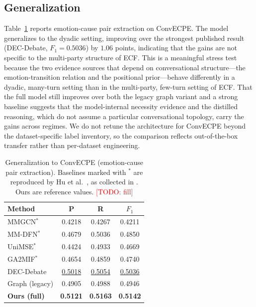 \documentclass[journal]{IEEEtran}
\newcommand{\todo}[1]{\textcolor{red}{[TODO: #1]}}
\begin{document}
\subsection{Generalization}
Table~\ref{tab:generalization} reports emotion-cause pair extraction on ConvECPE. The model
generalizes to the dyadic setting, improving over the strongest published result
(DEC-Debate, $F_1=0.5036$) by $1.06$ points, indicating that the gains are not specific to
the multi-party structure of ECF. %
This is a meaningful stress test because the two evidence sources that depend on conversational
structure---the emotion-transition relation and the positional prior---behave differently in a
dyadic, many-turn setting than in the multi-party, few-turn setting of ECF. That the full model
still improves over both the legacy graph variant and a strong baseline suggests that the
model-internal necessity evidence and the distilled reasoning, which do not assume a particular
conversational topology, carry the gains across regimes. We do not retune the architecture for
ConvECPE beyond the dataset-specific label inventory, so the comparison reflects out-of-the-box
transfer rather than per-dataset engineering.
\begin{table}[t]
\centering
\caption{Generalization to ConvECPE (emotion-cause pair extraction). Baselines marked with
$^{*}$ are reproduced by Hu et al.~\cite{jin2024unimeec}, as collected in
\cite{wu2025decdebate}. Ours are reference values. \todo{fill}}
\label{tab:generalization}
\begin{tabular}{lccc}
\toprule
Method & P & R & $F_1$ \\
\midrule
MMGCN$^{*}$ \cite{hu2021mmgcn}     & 0.4218 & 0.4267 & 0.4211 \\
MM-DFN$^{*}$ \cite{hu2022mmdfn}    & 0.4679 & 0.5036 & 0.4850 \\
UniMSE$^{*}$ \cite{hu2022unimse}   & 0.4424 & 0.4933 & 0.4669 \\
GA2MIF$^{*}$ \cite{li2023ga2mif}   & 0.4654 & 0.4859 & 0.4740 \\
DEC-Debate \cite{wu2025decdebate}  & \underline{0.5018} & \underline{0.5054} & \underline{0.5036} \\
\midrule
Graph (legacy)         & 0.4905 & 0.4988 & 0.4946 \\
\textbf{Ours (full)}   & \textbf{0.5121} & \textbf{0.5163} & \textbf{0.5142} \\
\bottomrule
\end{tabular}
\end{table}
\end{document}
